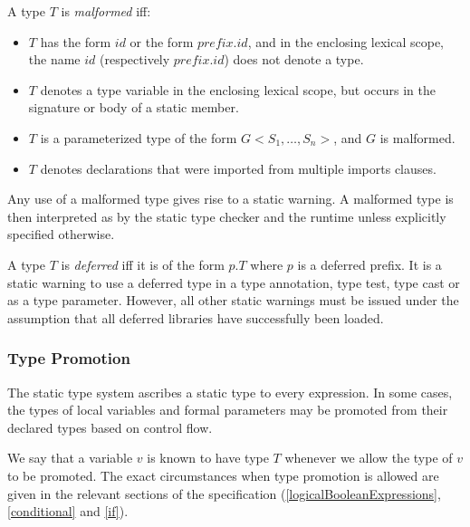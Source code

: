 \documentclass{article}
\begin{document}
\LMHash{}
A type $T$ is {\em malformed} iff:
\begin{itemize}
\item $T$ has the form $id$ or the form $prefix.id$, and in the enclosing lexical scope, the name $id$ (respectively $prefix.id$) does not denote a type.
\item $T$ denotes a type variable in the enclosing lexical scope, but occurs in the signature or body of a static member.
\item $T$ is a parameterized type of the form $G<S_1, \ldots , S_n>$, and  $G$ is malformed. 
\item $T$ denotes declarations that were imported from multiple imports clauses.
\end{itemize}

\LMHash{}
 Any use of a malformed  type gives rise to a static warning. A malformed type is then interpreted as \DYNAMIC{} by the static type checker and the runtime unless explicitly specified otherwise.
  

\LMHash{}
A type $T$ is {\em deferred} iff it is of the form $p.T$ where $p$ is a deferred prefix.
It is a static warning to use a deferred type in a type annotation, type test, type cast or as a type parameter. However, all other static warnings must be issued under the assumption that all deferred libraries have successfully been loaded.


\subsubsection{Type Promotion}   

\LMHash{}
The static type system ascribes a static type to every expression.  In some cases, the types of local variables and formal parameters may be promoted from their declared types based on control flow. 

\LMHash{}
We say that a variable $v$ is known to have type $T$ whenever we allow the type of $v$ to be promoted. The exact circumstances when type promotion is allowed are given in the relevant sections of the specification (\ref{logicalBooleanExpressions}, \ref{conditional} and \ref{if}).
\end{document}
